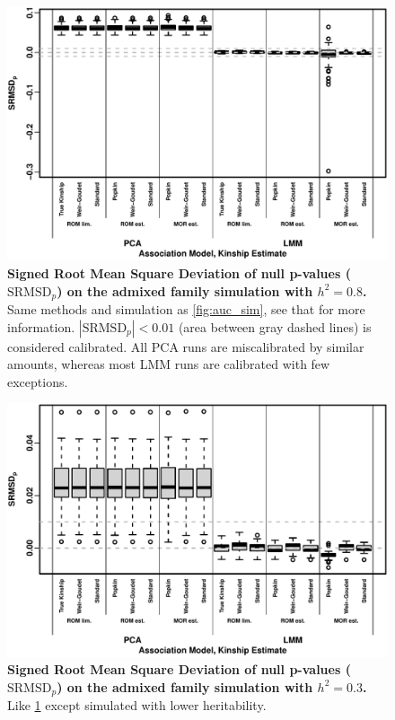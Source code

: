 \documentclass[11pt]{article}
\newcommand{\rmsd}{\text{SRMSD}_p}
\begin{document}
\begin{figure}[hp!]
  \centering
  \includegraphics[width=\textwidth]{sim-admix-n1000-m100000-k3-f0.3-s0.5-mc100-h0.8-g20-fes/rmsd.pdf}
  \caption{
    {\bf Signed Root Mean Square Deviation of null p-values ($\rmsd$) on the admixed family simulation with $h^2=0.8$.}
    Same methods and simulation as \cref{fig:auc_sim}, see that for more information.
    $|\rmsd| < 0.01$ (area between gray dashed lines) is considered calibrated.
    All PCA runs are miscalibrated by similar amounts, whereas most LMM runs are calibrated with few exceptions.
    }
  \label{fig:rmsd_sim}
\end{figure}

\begin{figure}[hp!]
  \centering
  \includegraphics[width=\textwidth]{sim-admix-n1000-m100000-k3-f0.3-s0.5-g20/h-0.3/rmsd.pdf}
  \caption{
    {\bf Signed Root Mean Square Deviation of null p-values ($\rmsd$) on the admixed family simulation with $h^2=0.3$.}
    Like \cref{fig:rmsd_sim} except simulated with lower heritability.
    }
  \label{fig:rmsd_sim-h3}
\end{figure}
\end{document}
